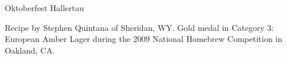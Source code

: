 \begin{recipe}{Oktoberfest Hallertau} %

\begin{aboutblock}
Recipe by Stephen Quintana of Sheridan, WY. Gold medal in Category 3: European
Amber Lager during the 2009 National Homebrew Competition in Oakland, CA.
\sourceaha
\end{aboutblock}


\begin{methodandtiming}

\begin{mashsteps}
\end{mashsteps}

\begin{fermentationsteps}
\end{fermentationsteps}

\end{methodandtiming}

\recipebreak

\begin{ingredientsblock}

\begin{malts}
\end{malts}

\begin{hops}
\end{hops}


\end{ingredientsblock}

\end{recipe}

